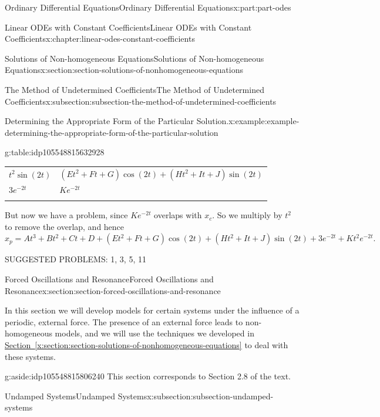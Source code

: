 \documentclass[twoside,10pt,]{book}
\newcommand{\xreffont}{\relax}
\numberwithin{equation}{part}
\newcommand{\hrulethick} {\noalign{\hrule height 0.11em}}
\begin{document}
\begin{partptx}{Ordinary Differential Equations}{}{Ordinary Differential Equations}{}{}{x:part:part-odes}
\begin{chapterptx}{Linear ODEs with Constant Coefficients}{}{Linear ODEs with Constant Coefficients}{}{}{x:chapter:linear-odes-constant-coefficients}
\begin{sectionptx}{Solutions of Non-homogeneous Equations}{}{Solutions of Non-homogeneous Equations}{}{}{x:section:section-solutions-of-nonhomogeneous-equations}
\begin{subsectionptx}{The Method of Undetermined Coefficients}{}{The Method of Undetermined Coefficients}{}{}{x:subsection:subsection-the-method-of-undetermined-coefficients}
\begin{example}{Determining the Appropriate Form of the Particular Solution.}{x:example:example-determining-the-appropriate-form-of-the-particular-solution}
\begin{tableptx}{\textbf{}}{g:table:idp105548815632928}{}
{\begin{tabular}{ll}
\(t^{2}\sin(2t)\)&\((Et^{2} + Ft + G)\cos(2t) + (Ht^{2} + It + J)\sin(2t)\)\tabularnewline\hrulethick
\(3e^{-2t}\)&\(Ke^{-2t}\)\tabularnewline\hrulethick
\end{tabular}
}%
\end{tableptx}%
 But now we have a problem, since \(Ke^{-2t}\) overlaps with \(x_{c}\). So we multiply by \(t^{2}\) to remove the overlap, and hence \(x_{p} = At^{3} + Bt^{2} + Ct + D + (Et^{2} + Ft + G)\cos(2t) + (Ht^{2} + It + J)\sin(2t) + 3e^{-2t} + Kt^{2}e^{-2t}.\)%
\end{example}
\end{subsectionptx}
\begin{conclusion}{}%
SUGGESTED PROBLEMS: 1, 3, 5, 11%
\end{conclusion}%
\end{sectionptx}
%
%
\typeout{************************************************}
\typeout{************************************************}
%
\begin{sectionptx}{Forced Oscillations and Resonance}{}{Forced Oscillations and Resonance}{}{}{x:section:section-forced-oscillations-and-resonance}
\begin{introduction}{}%
In this section we will develop models for certain systems under the influence of a periodic, external force. The presence of an external force leads to non-homogeneous models, and we will use the techniques we developed in \hyperref[x:section:section-solutions-of-nonhomogeneous-equations]{Section~{\xreffont\ref{x:section:section-solutions-of-nonhomogeneous-equations}}} to deal with these systems.%
\end{introduction}%
\begin{aside}{}{g:aside:idp105548815806240}%
This section corresponds to Section 2.8 of the text.%
\end{aside}
%
%
\typeout{************************************************}
\typeout{************************************************}
%
\begin{subsectionptx}{Undamped Systems}{}{Undamped Systems}{}{}{x:subsection:subsection-undamped-systems}

\end{subsectionptx}
\end{sectionptx}
\end{chapterptx}
\end{partptx}
\end{document}
